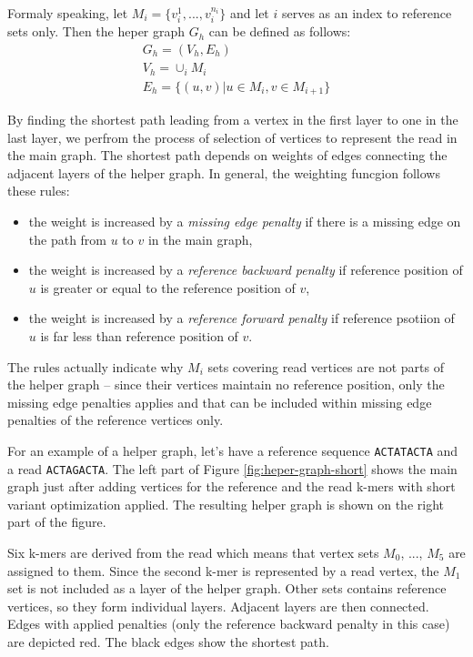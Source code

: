 Formaly speaking, let $M_i = \{v_{i}^{1}, ..., v_{i}^{n_i}\}$ and let $i$ serves as an index to reference sets only. Then the heper graph $G_h$ can be defined as follows:
\begin{gather}
G_h = (V_h, E_h) \\
V_h = \cup_i M_i \\
E_h = \{(u, v) | u \in M_i, v \in M_{i + 1}\}
\end{gather}

By finding the shortest path leading from a vertex in the first layer to one in the last layer, we perfrom the process of selection of vertices to represent the read in the main graph. The shortest path depends on weights of edges connecting the adjacent layers of the helper graph. In general, the weighting funcgion follows these rules:
\begin{itemize}
\item the weight is increased by a \textit{missing edge penalty} if there is a missing edge on the path from $u$ to $v$ in the main graph,
\item the weight is increased by a \textit{reference backward penalty} if reference position of $u$ is greater or equal to the reference position of $v$,
\item the weight is increased by a \textit{reference forward penalty} if reference psotiion of $u$ is far less than reference position of $v$.
\end{itemize}
The rules actually indicate why $M_i$ sets covering read vertices are not parts of the helper graph – since their vertices maintain no reference position, only the missing edge penalties applies and that can be included within missing edge penalties of the reference vertices only.

For an example of a helper graph, let's have a reference sequence \texttt{ACTATACTA} and a read \texttt{ACTAGACTA}. The left part of Figure \ref{fig:heper-graph-short} shows the main graph just after adding vertices for the reference and the read k-mers with short variant optimization applied. The resulting helper graph is shown on the right part of the figure.

Six k-mers are derived from the read which means that vertex sets $M_0$, ..., $M_5$ are assigned to them. Since the second k-mer is represented by a read vertex, the $M_1$ set is not included as a layer of the helper graph. Other sets contains reference vertices, so they form individual layers. Adjacent layers are then connected. Edges with applied penalties (only the reference backward penalty in this case) are depicted red. The black edges show the shortest path.

